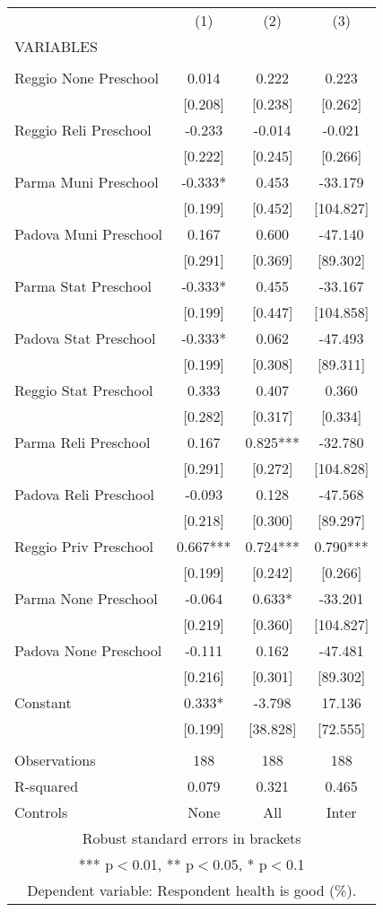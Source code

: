 \begin{tabular}{lccc} \hline
 & (1) & (2) & (3) \\
VARIABLES &  &  &  \\ \hline
 &  &  &  \\
Reggio None Preschool & 0.014 & 0.222 & 0.223 \\
 & [0.208] & [0.238] & [0.262] \\
Reggio Reli Preschool & -0.233 & -0.014 & -0.021 \\
 & [0.222] & [0.245] & [0.266] \\
Parma Muni Preschool & -0.333* & 0.453 & -33.179 \\
 & [0.199] & [0.452] & [104.827] \\
Padova Muni Preschool & 0.167 & 0.600 & -47.140 \\
 & [0.291] & [0.369] & [89.302] \\
Parma Stat Preschool & -0.333* & 0.455 & -33.167 \\
 & [0.199] & [0.447] & [104.858] \\
Padova Stat Preschool & -0.333* & 0.062 & -47.493 \\
 & [0.199] & [0.308] & [89.311] \\
Reggio Stat Preschool & 0.333 & 0.407 & 0.360 \\
 & [0.282] & [0.317] & [0.334] \\
Parma Reli Preschool & 0.167 & 0.825*** & -32.780 \\
 & [0.291] & [0.272] & [104.828] \\
Padova Reli Preschool & -0.093 & 0.128 & -47.568 \\
 & [0.218] & [0.300] & [89.297] \\
Reggio Priv Preschool & 0.667*** & 0.724*** & 0.790*** \\
 & [0.199] & [0.242] & [0.266] \\
Parma None Preschool & -0.064 & 0.633* & -33.201 \\
 & [0.219] & [0.360] & [104.827] \\
Padova None Preschool & -0.111 & 0.162 & -47.481 \\
 & [0.216] & [0.301] & [89.302] \\
Constant & 0.333* & -3.798 & 17.136 \\
 & [0.199] & [38.828] & [72.555] \\
 &  &  &  \\
Observations & 188 & 188 & 188 \\
R-squared & 0.079 & 0.321 & 0.465 \\
 Controls & None & All & Inter \\ \hline
\multicolumn{4}{c}{ Robust standard errors in brackets} \\
\multicolumn{4}{c}{ *** p$<$0.01, ** p$<$0.05, * p$<$0.1} \\
\multicolumn{4}{c}{ Dependent variable: Respondent health is good (\%).} \\
\end{tabular}
